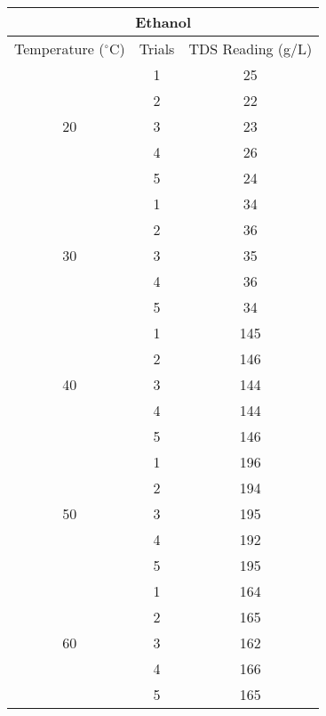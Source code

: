 

\begin{table}[H]
  \centering
    \begin{tabular}{ccc}
    \toprule
    \multicolumn{3}{c}{Ethanol} \\
    \midrule
    Temperature ($^\circ$C) & Trials & TDS Reading (g/L)  \\
    \midrule
    \multirow{5}[10]{*}{20} & 1     & 25 \\
\cmidrule{2-3}          & 2     & 22 \\
\cmidrule{2-3}          & 3     & 23 \\
\cmidrule{2-3}          & 4     & 26 \\
\cmidrule{2-3}          & 5     & 24 \\
    \midrule
    \multirow{5}[10]{*}{30} & 1     & 34 \\
\cmidrule{2-3}          & 2     & 36 \\
\cmidrule{2-3}          & 3     & 35 \\
\cmidrule{2-3}          & 4     & 36 \\
\cmidrule{2-3}          & 5     & 34 \\
    \midrule
    \multirow{5}[10]{*}{40} & 1     & 145 \\
\cmidrule{2-3}          & 2     & 146 \\
\cmidrule{2-3}          & 3     & 144 \\
\cmidrule{2-3}          & 4     & 144 \\
\cmidrule{2-3}          & 5     & 146 \\
    \midrule
    \multirow{5}[10]{*}{50} & 1     & 196 \\
\cmidrule{2-3}          & 2     & 194 \\
\cmidrule{2-3}          & 3     & 195 \\
\cmidrule{2-3}          & 4     & 192 \\
\cmidrule{2-3}          & 5     & 195 \\
    \midrule
    \multirow{5}[10]{*}{60} & 1     & 164 \\
\cmidrule{2-3}          & 2     & 165 \\
\cmidrule{2-3}          & 3     & 162 \\
\cmidrule{2-3}          & 4     & 166 \\
\cmidrule{2-3}          & 5     & 165 \\
    \bottomrule
    \end{tabular}%
  \label{tab:addlabel}%
\end{table}%

